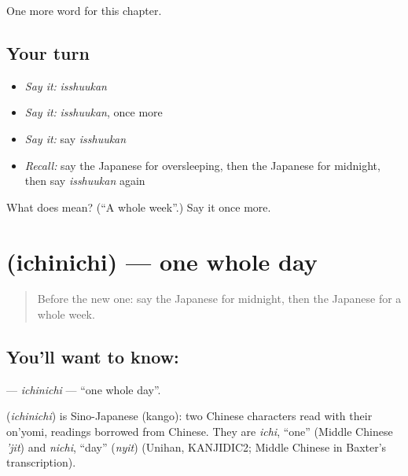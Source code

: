 \begin{grammarlens}[title={What you've built}]
One more word for this chapter.
\end{grammarlens}

\subsection*{Your turn}
\begin{itemize}
\raggedright
  \item \emph{Say it:} \emph{isshuukan}
  \item \emph{Say it:} \emph{isshuukan}, once more
  \item \emph{Say it:} say \emph{isshuukan}
  \item \emph{Recall:} say the Japanese for oversleeping, then the Japanese for midnight, then say \emph{isshuukan} again
\end{itemize}

\begin{tcolorbox}[breakable,colback=teal!4,colframe=teal!35!black,title={Before you move on}]
What does  mean? (\textquotedblleft{}A whole week\textquotedblright{}.) Say it once more.
\end{tcolorbox}
\section[\texorpdfstring{\ja{いちにち} (ichinichi)}{いちにち (ichinichi)}]{ (ichinichi) — one whole day}

\label{lesson:JA-C76-ichinichi}



\begin{quote}
Before the new one: say the Japanese for midnight, then the Japanese for a whole week.
\end{quote}

\subsection*{You'll want to know: }
\textbf{} — \emph{ichinichi} — \textquotedblleft{}one whole day\textquotedblright{}.

\begin{cousinweb}
\textbf{} (\emph{ichinichi}) is Sino-Japanese (kango): two Chinese characters read with their on'yomi, readings borrowed from Chinese. They are \emph{ichi}, \textquotedblleft{}one\textquotedblright{} (Middle Chinese \emph{'jit}) and \emph{nichi}, \textquotedblleft{}day\textquotedblright{} (\emph{nyit}) (Unihan, KANJIDIC2; Middle Chinese in Baxter's transcription).
\end{cousinweb}

